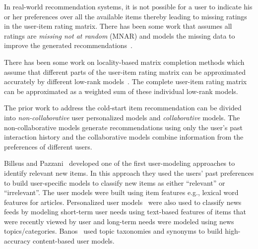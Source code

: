In real-world recommendation systems, it is not possible for a user to indicate
his or her preferences over all the available items thereby leading to missing
ratings in the user-item rating matrix. There has been some work that assumes
all ratings are \emph{missing not at random} (MNAR) and models the missing data to improve the
generated recommendations~\cite{marlin2012collaborative, pan2008one,
hernandez2014probabilistic, Steck2010MNAR, Steck2013EvalRec, lim2015top,
KimRecsys2014}.
\iffalse
However, in our work, we focus on investigating how
do the missing ratings, i.e., both \emph{missing at random} (MAR) and \emph{missing not at
random} (MNAR), or specifically how does the presence of few ratings for the
users and the items affect the matrix completion-based methods. We use our analysis
to develop a matrix completion-based approach to improve recommendations for the
users who have provided few ratings on items or for the items that have
received few ratings from the users.
\fi

There has been some work on locality-based matrix completion  methods which
assume that different parts of the user-item rating matrix can be approximated
accurately by different low-rank models~\cite{lee2013local,
lee2014local,chen2015wemarec}. The complete user-item rating matrix
can be approximated as a weighted sum of these individual low-rank models. 

\iffalse
In
our work, we estimate a single low-rank model, rather than multiple different
low-rank models, that adaptively select a subset of ranks for a rating by a
user on an item by considering the number of ratings provided by the user and
the number of ratings received by the item.
\fi




The prior work to address the cold-start item recommendation can be divided 
into \emph{non-collaborative} user personalized models 
and \emph{collaborative} models. The non-collaborative models generate recommendations 
using only the user's past
interaction history and the collaborative models combine information from
the preferences of different users. 

Billsus and Pazzani~\cite{billsus99} developed one of the first user-modeling
approaches to identify relevant new items. In this approach they used the users'
past preferences to build user-specific models to classify new items
as either ``relevant'' or ``irrelevant''. The user models were built using
item features e.g., lexical word features for articles. Personalized 
user models~\cite{rodriguez01} were also used to classify news feeds by modeling short-term user needs 
using text-based features of items that were recently viewed by user and long-term needs were
modeled using news topics/categories. Banos~\cite{banos06}
used topic taxonomies and synonyms to build high-accuracy 
content-based user models. 

